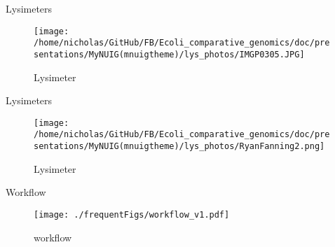 \documentclass[17pt,aspectratio=169]{beamer}
\begin{document}
\begin{frame}[label=sec-10]{Lysimeters}
\begin{figure}[htb]
\centering
\texttt{[image: /home/nicholas/GitHub/FB/Ecoli\_comparative\_genomics/doc/presentations/MyNUIG(mnuigtheme)/lys\_photos/IMGP0305.JPG]}
\caption{\label{fig:lys3}Lysimeter}
\end{figure}
\end{frame}

\begin{frame}[label=sec-11]{Lysimeters}
\begin{figure}[htb]
\centering
\texttt{[image: /home/nicholas/GitHub/FB/Ecoli\_comparative\_genomics/doc/presentations/MyNUIG(mnuigtheme)/lys\_photos/RyanFanning2.png]}
\caption{\label{fig:lys3}Lysimeter}
\end{figure}
\end{frame}



\begin{frame}[label=sec-12]{Workflow}
\begin{figure}[htb]
\centering
\texttt{[image: ./frequentFigs/workflow\_v1.pdf]}
\caption{\label{fig:workflow}workflow}
\end{figure}
\end{frame}

\end{document}
